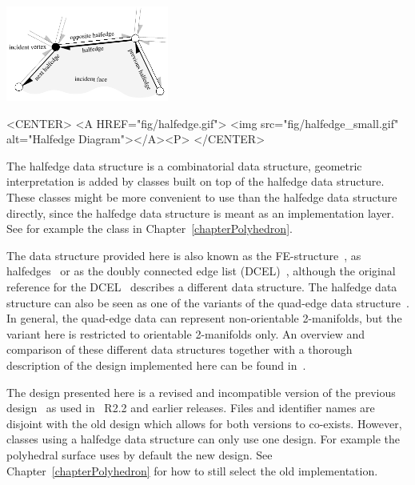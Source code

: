 \begin{ccTexOnly}
    \vspace{-4mm}
    \begin{center}
      \parbox{0.4\textwidth}{%
          \includegraphics[width=0.4\textwidth]{HalfedgeDS/fig/halfedge}%
      }
    \end{center}
    \vspace{-3mm}
\end{ccTexOnly}

\begin{ccHtmlOnly}
    <CENTER>
    <A HREF="fig/halfedge.gif">
        <img src="fig/halfedge_small.gif" alt="Halfedge Diagram"></A><P>
    </CENTER>
\end{ccHtmlOnly}

The halfedge data structure is a combinatorial data structure,
geometric interpretation is added by classes built on top of the
halfedge data structure.  These classes might be more convenient to
use than the halfedge data structure directly, since the halfedge data
structure is meant as an implementation layer.  See for example the
 class in Chapter~\ref{chapterPolyhedron}.

The data structure provided here is also known as the
FE-structure~\cite{w-ebdss-85}, as
halfedges~\cite{m-ism-88,cgal:bfh-mgedm-95} or as the doubly connected edge
list (DCEL)~\cite{bkos-cgaa-97}, although the original reference for
the DCEL~\cite{mp-fitcp-78} describes a different data structure. The
halfedge data structure can also be seen as one of the variants of the
quad-edge data structure~\cite{gs-pmgsc-85}. In general, the quad-edge
data can represent non-orientable 2-manifolds, but the variant here is
restricted to orientable 2-manifolds only. An overview and comparison
of these different data structures together with a thorough
description of the design implemented here can be found
in~\cite{k-ugpdd-99}.  

The design presented here is a revised and incompatible version of the
previous design~\cite{k-ddsps-98} as used in \cgal\ R2.2 and earlier
releases. Files and identifier names are disjoint with the old design
which allows for both versions to co-exists. However, classes using a
halfedge data structure can only use one design. For example the
polyhedral surface  uses by default the new
design. See Chapter~\ref{chapterPolyhedron} for how to still select
the old implementation.

